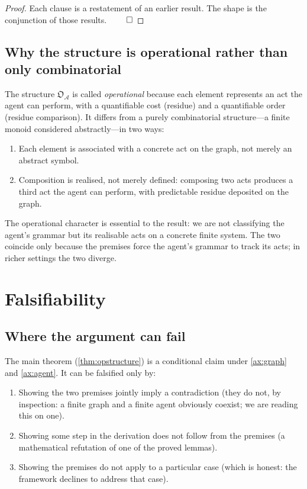 \documentclass[11pt,a4paper]{article}
\theoremstyle{thmstyle}
\theoremstyle{definition}
\theoremstyle{remark}
\newcommand{\Agent}{\mathcal{A}}
\newcommand{\OpStr}{\mathfrak{O}}
\begin{document}
\begin{proof}
Each clause is a restatement of an earlier result. The shape is the
conjunction of those results. $\qed$
\end{proof}

\subsection{Why the structure is operational rather than only
combinatorial}

The structure $\OpStr_\Agent$ is called \emph{operational} because
each element represents an act the agent can perform, with a
quantifiable cost (residue) and a quantifiable order (residue
comparison). It differs from a purely combinatorial structure---a
finite monoid considered abstractly---in two ways:
\begin{enumerate}[nosep,leftmargin=*]
\item Each element is associated with a concrete act on the graph,
not merely an abstract symbol.
\item Composition is realised, not merely defined: composing two
acts produces a third act the agent can perform, with predictable
residue deposited on the graph.
\end{enumerate}
The operational character is essential to the result: we are not
classifying the agent's grammar but its realisable acts on a
concrete finite system. The two coincide only because the premises
force the agent's grammar to track its acts; in richer settings
the two diverge.

\section{Falsifiability}
\label{sec:falsifiability}

\subsection{Where the argument can fail}

The main theorem (\cref{thm:opstructure}) is a conditional claim
under \cref{ax:graph} and \cref{ax:agent}. It can be falsified only
by:
\begin{enumerate}[nosep,leftmargin=*]
\item Showing the two premises jointly imply a contradiction (they
do not, by inspection: a finite graph and a finite agent obviously
coexist; we are reading this on one).
\item Showing some step in the derivation does not follow from the
premises (a mathematical refutation of one of the proved lemmas).
\item Showing the premises do not apply to a particular case (which
is honest: the framework declines to address that case).
\end{enumerate}
\end{document}
